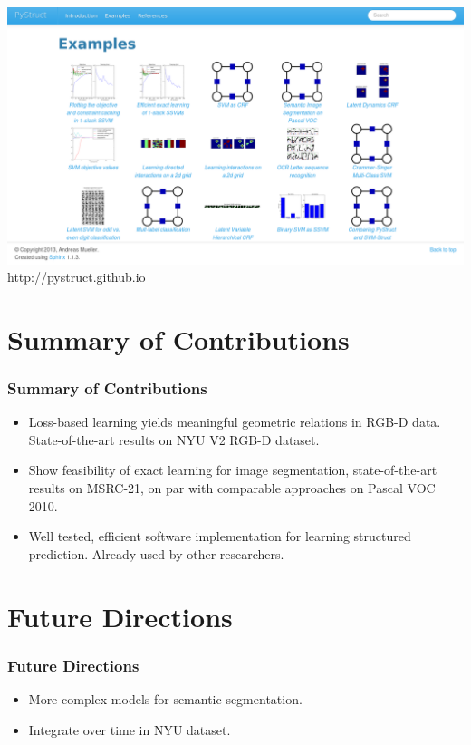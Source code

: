 \documentclass[final,ignorenonframetext,compress]{beamer}
\begin{document}
    \begin{frame}
        \begin{center}
            \includegraphics[width=\linewidth]{images/example_gallery}\\
            http://pystruct.github.io
        \end{center}
    \end{frame}


\section*{Summary of Contributions}
\begin{frame}
    \frametitle{Summary of Contributions}
    \begin{itemize}
        \item<1-> Loss-based learning yields meaningful geometric relations in RGB-D data. State-of-the-art results on NYU V2 RGB-D dataset.
        \item<2-> Show feasibility of exact learning for image segmentation, state-of-the-art results on MSRC-21, on par with comparable approaches on Pascal VOC 2010.
        \item<3-> Well tested, efficient software implementation for learning structured prediction. Already used by other researchers.
    \end{itemize}
\end{frame}

\section*{Future Directions}
\begin{frame}
    \frametitle{Future Directions}
    \begin{itemize}
        \item More complex models for semantic segmentation.
        \item Integrate over time in NYU dataset.
    \end{itemize}
\end{frame}
\end{document}
